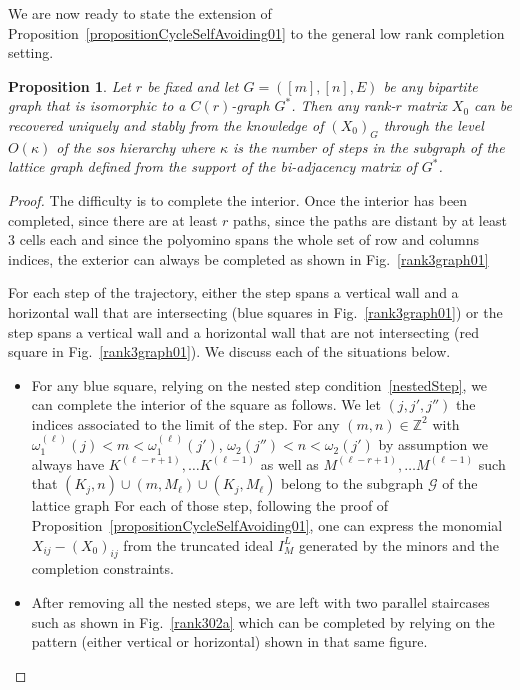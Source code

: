 \documentclass[12pt]{article}
\newtheorem{proposition}{Proposition}
\begin{document}
We are now ready to state the extension of Proposition~\ref{propositionCycleSelfAvoiding01} to the general low rank completion setting. 

\begin{proposition}\label{generalLowRankNestedSteps}
Let $r$ be fixed and let $G = ([m], [n], E)$ be any bipartite graph that is isomorphic to a $C(r)$-graph $G^*$. Then any rank-$r$ matrix $ X_0$ can be recovered uniquely and stably from the knowledge of $(X_0)_{G}$ through the level $O(\kappa)$ of the sos hierarchy where $\kappa$ is the number of steps in the subgraph of the lattice graph defined from the support of the bi-adjacency matrix of $G^*$. 
\end{proposition}

\begin{proof}
The difficulty is to complete the interior.  Once the interior has been completed, since there are at least $r$ paths,  since the paths are distant by at least $3$ cells each and since the polyomino spans the whole set of row and columns indices, the exterior can always be completed as shown in Fig.~\ref{rank3graph01}

For each step of the trajectory, either the step spans a vertical wall and a horizontal wall that are intersecting (blue squares in Fig.~\ref{rank3graph01}) or the step spans a vertical wall and a horizontal wall that are not intersecting (red square in Fig.~\ref{rank3graph01}). We discuss each of the situations below.   

\begin{itemize}
\item For any blue square, relying on the nested step condition~\ref{nestedStep}, we can complete the interior of the square as follows. We let $(j,j',j'')$ the indices associated to the limit of the step.  For any $(m,n)\in \mathbb{Z}^2$ with $\omega^{(\ell)}_1(j)<m<\omega^{(\ell)}_1(j')$, $\omega_2(j'')<n<\omega_2(j')$ by assumption we always have $K^{(\ell-r+1)}, \ldots K^{(\ell-1)}$ as well as $M^{(\ell-r+1)}, \ldots M^{(\ell-1)}$ such that $(K_j, n)\cup (m, M_\ell)\cup (K_j, M_\ell)$ belong to the subgraph $\mathcal{G}$ of the lattice graph   For each of those step, following the proof of Proposition~\ref{propositionCycleSelfAvoiding01}, one can express the monomial $X_{ij} - (X_0)_{ij}$ from the truncated ideal $I_M^{L}$ generated by the minors and the completion constraints.  

\item After removing all the nested steps, we are left with two parallel staircases such as shown in Fig.~\ref{rank302a} which can be completed by relying on the pattern (either vertical or horizontal) shown in that same figure. 
\end{itemize}


\end{proof}
\end{document}

